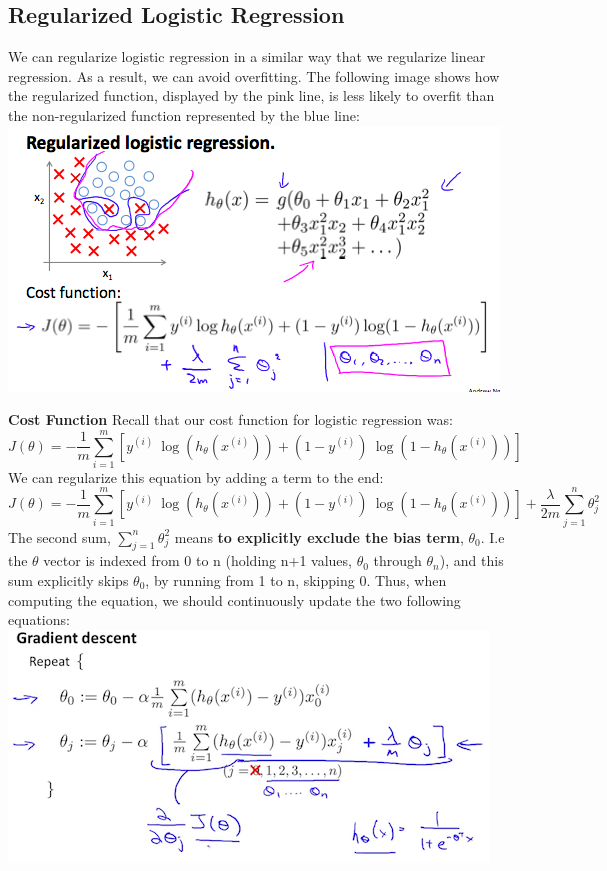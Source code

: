 \documentclass{article}
\begin{document}
\subsection{Regularized Logistic Regression}
We can regularize logistic regression in a similar way that we regularize linear regression. As a result, we can avoid overfitting. The following image shows how the regularized function, displayed by the pink line, is less likely to overfit than the non-regularized function represented by the blue line:\\
\includegraphics[width=\textwidth]{Regularized_Logistic_Regression.png}

\textbf{Cost Function}
Recall that our cost function for logistic regression was:
$$J(\theta) = - \frac{1}{m} \sum_{i=1}^m [ y^{(i)}\ \log (h_\theta (x^{(i)})) + (1 - y^{(i)})\ \log (1 - h_\theta(x^{(i)}))]$$
We can regularize this equation by adding a term to the end:
$$J(\theta) = - \frac{1}{m} \sum_{i=1}^m [ y^{(i)}\ \log (h_\theta (x^{(i)})) + (1 - y^{(i)})\ \log (1 - h_\theta(x^{(i)}))] + \frac{\lambda}{2m}\sum_{j=1}^n \theta_j^2$$
The second sum, $\sum_{j=1}^n \theta_j^2$ means \textbf{to explicitly exclude the bias term}, $\theta_0$. I.e the $\theta$ vector is indexed from 0 to n (holding n+1 values, $\theta_0$ through $\theta_n$), and this sum explicitly skips $\theta_0$, by running from 1 to n, skipping 0. Thus, when computing the equation, we should continuously update the two following equations:\\
\includegraphics[width=\textwidth]{Gradient-Descent.png}
\end{document}
